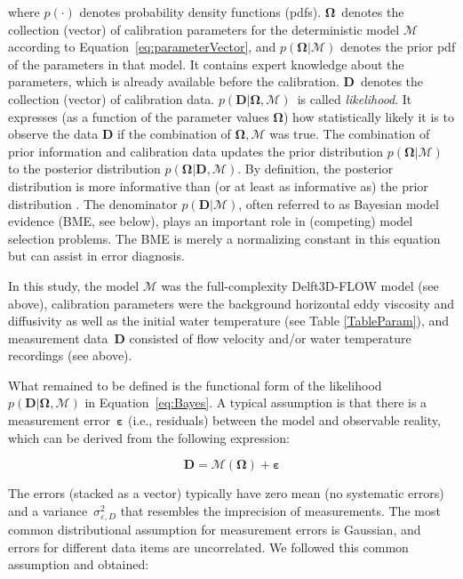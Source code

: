 \documentclass[draft,linenumbers,onecolumn]{agujournal2019} %
\begin{document}
where $p(\cdot)$ denotes probability density functions (pdfs). $\mathbf{\Omega}$~denotes the collection (vector) of calibration parameters for the deterministic model $\mathcal{M}$ according to Equation~\ref{eq:parameterVector}, and $p(\mathbf{\Omega} | \mathcal{M})$ denotes the prior pdf of the parameters in that model. It contains expert knowledge about the parameters, which is already available before the calibration. $\mathbf{D}$~denotes the collection (vector) of calibration data. $p(\mathbf{D} | \mathbf{\Omega} , \mathcal{M})$~is called \textit{likelihood}. It expresses (as a function of the parameter values $\mathbf{\Omega}$) how statistically likely it is to observe the data $\mathbf{D}$ if the combination of $\mathbf{\Omega},\mathcal{M}$ was true. The combination of prior information and calibration data updates the prior distribution $p(\mathbf{\Omega}|\mathcal{M})$ to the posterior distribution $p(\mathbf{\Omega} \vert \mathbf{D},\mathcal{M})$. By definition, the posterior distribution is more informative than (or at least as informative as) the prior distribution \cite{box_bayesian_1973, oladyshkin_connection_2019}. The denominator $p(\mathbf{D}|\mathcal{M})$, often referred to as Bayesian model evidence (BME, see below), plays an important role in (competing) model selection problems. The BME is merely a normalizing constant in this equation but can assist in error diagnosis.

In this study, the model $\mathcal{M}$ was the full-complexity Delft3D-FLOW model (see above), calibration parameters were the background horizontal eddy viscosity and diffusivity as well as the initial water temperature (see Table \ref{TableParam}), and measurement data~$\mathbf{D}$ consisted of flow velocity and/or water temperature recordings (see above).

What remained to be defined is the functional form of the likelihood~$p(\mathbf{D} \vert \mathbf{\Omega}, \mathcal{M})$ in Equation~\ref{eq:Bayes}. A typical assumption is that there is a measurement error~$\boldsymbol{\varepsilon}$ (i.e., residuals) between the model and observable reality, which can be derived from the following expression:

\begin{equation}
	\mathbf{D} = \mathcal{M}(\mathbf{\Omega}) + \boldsymbol{\varepsilon}
	\label{eq:residuals}
\end{equation}

The errors (stacked as a vector) typically have zero mean (no systematic errors) and a variance~$\sigma^2_{\varepsilon,D}$ that resembles the imprecision of measurements. The most common distributional assumption for measurement errors is Gaussian, and errors for different data items are uncorrelated. We followed this common assumption and obtained:
\end{document}
